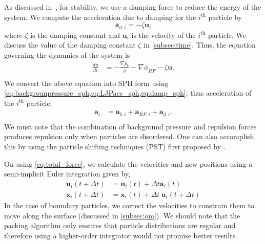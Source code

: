 \documentclass[preprint,12pt]{elsarticle}
\newcommand{\ten}[1]{\ensuremath{\mathbf{#1}}}
\begin{document}
As discussed in~\cite{colagrossi2012particle}, for stability, we use a
damping force to reduce the energy of the system. We compute the acceleration
due to damping for the $i^\text{th}$ particle by
\begin{equation}
  \label{eq:damp_sph}
 \ten{a}_{d,i} = -\zeta \ten{u}_i
\end{equation}
where $\zeta$ is the damping constant and $\ten{u}_i$ is the velocity of the
$i^\text{th}$ particle. We discuss the value of the damping constant $\zeta$ in \cref{subsec:time}. Thus, the equation governing the dynamics of
the system is
\begin{equation}
  \label{eq:total_force}
  \begin{split}
 \frac{du}{dt} &= -\frac{\nabla p_b}{\rho} - \nabla \phi_{RF} - \zeta \ten{u}.\\
  \end{split}
\end{equation}
We convert the above equation into SPH form using
\cref{eq:backgrounpressure_sph,eq:LJPacc_sph,eq:damp_sph}; thus acceleration
of the $i^\text{th}$ particle,
\begin{equation}
  \label{eq:total_force_i}
  \begin{split}
  \ten{a}_i &= \ten{a}_{b,i} + \ten{a}_{RF,i} + \ten{a}_{d,i}. \\
  \end{split}
\end{equation}
We must note that the combination of background pressure and
repulsion forces produces repulsion only when particles are disordered. One
can also accomplish this by using the particle shifting techniques (PST)
first proposed by \cite{xu2009accuracy}.

On using \cref{eq:total_force}, we calculate the velocities and new positions
using a semi-implicit Euler integration given by,
\begin{equation}
  \label{eq:velocity}
  \begin{split}
 \ten{u}_i(t + \Delta t) &= \ten{u}_i(t) + \Delta t \ten{a}_{i}(t) \\
 \ten{x}_i(t + \Delta t) &= \ten{x}_i(t) + \Delta t \ \ten{u}_i(t+\Delta t)
\end{split}
\end{equation}
In the case of boundary particles, we correct the velocities to constrain
them to move along the surface (discussed in \cref{subsec:om}). We should
note that the packing algorithm only ensures that particle distributions are
regular and therefore using a higher-order integrator would not promise
better results.
\end{document}
